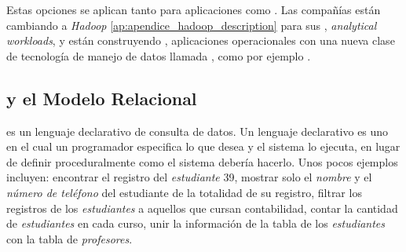 Estas opciones se aplican tanto para aplicaciones  como . Las compañías están cambiando \workloads a \textit{Hadoop} \ref{ap:apendice_hadoop_description} para sus \offline, \textit{analytical workloads}, y están construyendo \online, aplicaciones operacionales con una nueva clase de tecnología de manejo de datos llamada \nosql, como por ejemplo \mongodb.

\subsection{\sql y el Modelo Relacional}

\sql es un lenguaje declarativo de consulta de datos. Un lenguaje declarativo es uno en el cual un programador especifica lo que desea y el sistema lo ejecuta, en lugar de definir proceduralmente como el sistema debería hacerlo. Unos pocos ejemplos incluyen: encontrar el registro del \textit{estudiante} 39, mostrar solo el \textit{nombre} y el \textit{número de teléfono} del estudiante de la totalidad de su registro, filtrar los registros de los \textit{estudiantes} a aquellos que cursan contabilidad, contar la cantidad de \textit{estudiantes} en cada curso, unir la información de la tabla de los \textit{estudiantes} con la tabla de \textit{profesores}.


